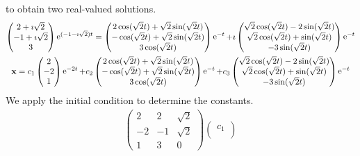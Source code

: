\begin{Solution}
  to obtain two real-valued solutions.
  \begin{gather*}
    \begin{pmatrix} 
      2 + \imath \sqrt{2} \\ 
      -1 + \imath \sqrt{2} \\ 
      3 
    \end{pmatrix} \mathop{\mathrm{e}}\nolimits^{(-1 - \imath \sqrt{2}) t}
    = 
    \begin{pmatrix} 
      2 \cos(\sqrt{2} t) + \sqrt{2} \sin(\sqrt{2} t) \\
      -\cos(\sqrt{2} t) + \sqrt{2} \sin(\sqrt{2} t) \\
      3 \cos(\sqrt{2} t) 
    \end{pmatrix} \mathop{\mathrm{e}}\nolimits^{-t}
    + \imath \begin{pmatrix} 
      \sqrt{2} \cos(\sqrt{2} t) - 2 \sin(\sqrt{2} t) \\
      \sqrt{2} \cos(\sqrt{2} t) + \sin(\sqrt{2} t) \\
      -3 \sin(\sqrt{2} t) 
    \end{pmatrix} \mathop{\mathrm{e}}\nolimits^{-t} \\
    \mathbf{x} = 
    c_1 \begin{pmatrix} 2 \\ -2 \\ 1 \end{pmatrix} \mathop{\mathrm{e}}\nolimits^{-2 t}
    + c_2 \begin{pmatrix} 2 \cos(\sqrt{2} t) + \sqrt{2} \sin(\sqrt{2} t) \\
      -\cos(\sqrt{2} t) + \sqrt{2} \sin(\sqrt{2} t) \\
      3 \cos(\sqrt{2} t) \end{pmatrix} \mathop{\mathrm{e}}\nolimits^{-t}
    + c_3 \begin{pmatrix} \sqrt{2} \cos(\sqrt{2} t) - 2 \sin(\sqrt{2} t) \\
      \sqrt{2} \cos(\sqrt{2} t) + \sin(\sqrt{2} t) \\
      -3 \sin(\sqrt{2} t) \end{pmatrix} \mathop{\mathrm{e}}\nolimits^{-t}
  \end{gather*}
  We apply the initial condition to determine the constants.
  \begin{gather*}
    \begin{pmatrix}
      2 & 2 & \sqrt{2} \\
      -2 & -1 & \sqrt{2} \\
      1 & 3 & 0 
    \end{pmatrix}
    \begin{pmatrix}
      c_1 \\

\end{pmatrix}
\end{gather*}
\end{Solution}
